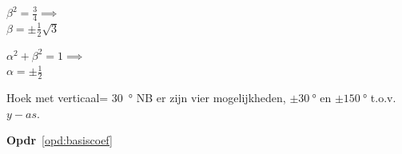 \documentclass[../../main.tex]{subfiles}
\begin{document}
$\beta^2=\tfrac{3}{4} \implies$\\ $\beta=\pm\tfrac{1}{2}\sqrt{3}$

$\alpha^2+\beta^2=1 \implies$\\ $\alpha=\pm\tfrac{1}{2}$

Hoek met verticaal= \SI{30}{\degree} NB er zijn vier mogelijkheden,
$\pm \SI{30}{\degree}$ en $\pm \SI{150}{\degree}$ t.o.v. $y-as$.


\textbf{Opdr}~\ref{opd:basiscoef} 
\begin{flushleft}
\begin{minipage}{.75\textwidth}
\def\gcolor{green!60!black}
\def\ojfrangle{0}
\def\ojobangle{45}
\def\statangle{-15}%
\def\ojscale{.65}
\end{minipage}
\end{flushleft}
\end{document}
